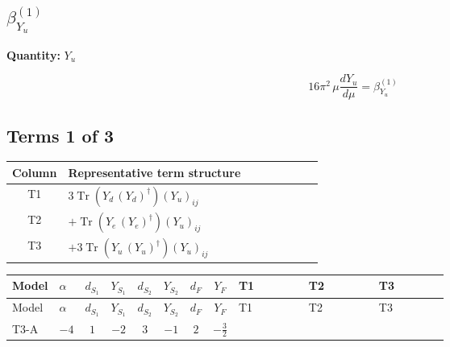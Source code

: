 \documentclass[8pt]{article}
\begin{document}
\begin{landscape}
\section*{$\beta_{Y_u}^{(1)}$}
\noindent\textbf{Quantity: }$Y_u$\par\smallskip
\[16\pi^2\,\mu\frac{d Y_u}{d\mu}=\beta_{Y_u}^{(1)}\]
\subsection*{Terms 1 of 3}
\begin{center}
\begin{tabular}{@{}c >{\raggedright\arraybackslash}p{0.82\linewidth}@{}}
\toprule
Column & Representative term structure \\
\midrule
T1 & \(\displaystyle 3 \operatorname{Tr}\!\left({Y_d}\,\left({Y_d}\right)^{\dagger}\right) \left({Y_u}\right)_{ij}\) \\
\midrule
T2 & \(\displaystyle +\operatorname{Tr}\!\left({Y_e}\,\left({Y_e}\right)^{\dagger}\right) \left({Y_u}\right)_{ij}\) \\
\midrule
T3 & \(\displaystyle +3 \operatorname{Tr}\!\left({Y_u}\,\left({Y_u}\right)^{\dagger}\right) \left({Y_u}\right)_{ij}\) \\
\midrule
\bottomrule
\end{tabular}
\end{center}
\smallskip
\tiny
\begin{longtable}{@{}llcccccc >{\raggedright\arraybackslash}p{0.21\linewidth} >{\raggedright\arraybackslash}p{0.21\linewidth} >{\raggedright\arraybackslash}p{0.21\linewidth}@{}}
\toprule
Model & $\alpha$ & $d_{S_1}$ & $Y_{S_1}$ & $d_{S_2}$ & $Y_{S_2}$ & $d_F$ & $Y_F$ & T1 & T2 & T3 \\
\midrule
\endfirsthead
\toprule
Model & $\alpha$ & $d_{S_1}$ & $Y_{S_1}$ & $d_{S_2}$ & $Y_{S_2}$ & $d_F$ & $Y_F$ & T1 & T2 & T3 \\
\midrule
\endhead
T3-A & $-4$ & $1$ & $-2$ & $3$ & $-1$ & $2$ & $-\frac{3}{2}$ & \scriptsize\adjustbox{max width=\linewidth}{$\begin{gathered} 3 \operatorname{Tr}\!\left({Y_d}\,\left({Y_d}\right)^{\dagger}\right) \left({Y_u}\right)_{ij}\end{gathered}$} & \scriptsize\adjustbox{max width=\linewidth}{$\begin{gathered} +\operatorname{Tr}\!\left({Y_e}\,\left({Y_e}\right)^{\dagger}\right) \left({Y_u}\right)_{ij}\end{gathered}$} & \scriptsize\adjustbox{max width=\linewidth}{$\begin{gathered} +3 \operatorname{Tr}\!\left({Y_u}\,\left({Y_u}\right)^{\dagger}\right) \left({Y_u}\right)_{ij}\end{gathered}$} \\

\end{longtable}
\end{landscape}
\end{document}
